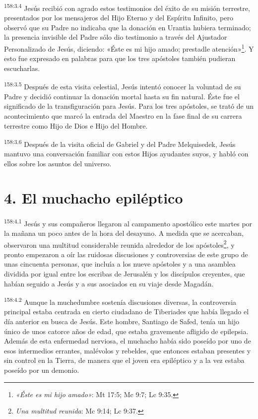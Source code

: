 \par
\textsuperscript{158:3.4} Jesús recibió con agrado estos testimonios del éxito de su misión terrestre, presentados por los mensajeros del Hijo Eterno y del Espíritu Infinito, pero observó que su Padre no indicaba que la donación en Urantia hubiera terminado; la presencia invisible del Padre sólo dio testimonio a través del Ajustador Personalizado de Jesús, diciendo: «Éste es mi hijo amado; prestadle atención»\footnote{\textit{«Éste es mi hijo amado»}: Mt 17:5; Mc 9:7; Lc 9:35.}. Y esto fue expresado en palabras para que los tres apóstoles también pudieran escucharlas.

\par
\textsuperscript{158:3.5} Después de esta visita celestial, Jesús intentó conocer la voluntad de su Padre y decidió continuar la donación mortal hasta su fin natural. Éste fue el significado de la transfiguración para Jesús. Para los tres apóstoles, se trató de un acontecimiento que marcó la entrada del Maestro en la fase final de su carrera terrestre como Hijo de Dios e Hijo del Hombre.

\par
\textsuperscript{158:3.6} Después de la visita oficial de Gabriel y del Padre Melquisedek, Jesús mantuvo una conversación familiar con estos Hijos ayudantes suyos, y habló con ellos sobre los asuntos del universo.

\section*{4. El muchacho epiléptico}
\par
\textsuperscript{158:4.1} Jesús y sus compañeros llegaron al campamento apostólico este martes por la mañana un poco antes de la hora del desayuno. A medida que se acercaban, observaron una multitud considerable reunida alrededor de los apóstoles\footnote{\textit{Una multitud reunida}: Mc 9:14; Lc 9:37.}, y pronto empezaron a oír las ruidosas discusiones y controversias de este grupo de unas cincuenta personas, que incluía a los nueve apóstoles y a una asamblea dividida por igual entre los escribas de Jerusalén y los discípulos creyentes, que habían seguido a Jesús y a sus asociados en su viaje desde Magadán.

\par
\textsuperscript{158:4.2} Aunque la muchedumbre sostenía discusiones diversas, la controversia principal estaba centrada en cierto ciudadano de Tiberiades que había llegado el día anterior en busca de Jesús. Este hombre, Santiago de Safed, tenía un hijo único de unos catorce años de edad, que estaba gravemente afligido de epilepsia. Además de esta enfermedad nerviosa, el muchacho había sido poseído por uno de esos intermedios errantes, malévolos y rebeldes, que entonces estaban presentes y sin control en la Tierra, de manera que el joven era epiléptico y a la vez estaba poseído por un demonio.

